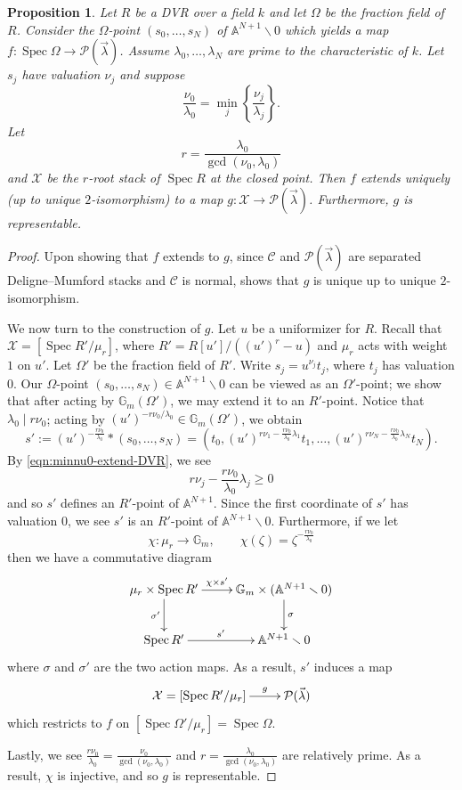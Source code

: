\documentclass[a4paper,12pt]{amsart}
\newtheorem{prop}[thm]{Proposition}
\theoremstyle{definition}
\newcommand{\bG}{\mathbb{G}}
\newcommand{\bA}{\mathbb{A}}
\newcommand{\cX}{\mathcal{X}}
\newcommand{\cC}{\mathcal{C}}
\newcommand{\Pcv}{\mathcal{P}(\vec{\lambda})}
\DeclareMathOperator{\Spec}{Spec}
\renewcommand{\setminus}{\smallsetminus}
\begin{document}
	\begin{prop}\label{prop:univ-tuning-stack-local-computation}
		Let $R$ be a DVR over a field $k$ and let $\Omega$ be the fraction field of $R$. Consider the $\Omega$-point $(s_0,\dots,s_N)$ of $\bA^{N+1}\setminus0$ which yields a map $f\colon\Spec\Omega\to\Pcv$. Assume $\lambda_0,\dots,\lambda_N$ are prime to the characteristic of $k$. Let $s_j$ have valuation $\nu_j$ and suppose
		\begin{equation}\label{eqn:minnu0-extend-DVR}
			\frac{\nu_0}{\lambda_0}=\min_j\left\{\frac{\nu_j}{\lambda_j}\right\}.
		\end{equation}
		Let
		\[
		r=\frac{\lambda_0}{\gcd(\nu_0,\lambda_0)}
		\]
		and $\cX$ be the $r$-root stack of $\Spec R$ at the closed point. Then $f$ extends uniquely (up to unique $2$-isomorphism) to a map $g\colon\cX\to\Pcv$. Furthermore, $g$ is representable.
	\end{prop}
	\begin{proof}
		Upon showing that $f$ extends to $g$, since $\cC$ and $\Pcv$ are separated Deligne--Mumford stacks and $\cC$ is normal, \cite[Prop. 1.2]{FMN} shows that $g$ is unique up to unique $2$-isomorphism.
		
		We now turn to the construction of $g$. Let $u$ be a uniformizer for $R$. Recall that $\cX=[\Spec R'/\mu_r]$, where $R'=R[u']/((u')^r-u)$ and $\mu_r$ acts with weight $1$ on $u'$. Let $\Omega'$ be the fraction field of $R'$. Write $s_j=u^{\nu_j}t_j$, where $t_j$ has valuation $0$. Our $\Omega$-point $(s_0,\dots,s_N)\in\bA^{N+1}\setminus0$ can be viewed as an $\Omega'$-point; we show that after acting by $\bG_m(\Omega')$, we may extend it to an $R'$-point. Notice that $\lambda_0\mid r\nu_0$; acting by $(u')^{-r\nu_0/\lambda_0}\in\bG_m(\Omega')$, we obtain
		\[
		s':=(u')^{-\frac{r\nu_0}{\lambda_0}}*(s_0,\dots,s_N)=(t_0,(u')^{r\nu_1-\frac{r\nu_0}{\lambda_0}\lambda_1}t_1,\dots,(u')^{r\nu_N-\frac{r\nu_0}{\lambda_0}\lambda_N}t_N).
		\]
		By \eqref{eqn:minnu0-extend-DVR}, we see
		\[
		r\nu_j-\frac{r\nu_0}{\lambda_0}\lambda_j\geq0
		\]
		and so $s'$ defines an $R'$-point of $\bA^{N+1}$. Since the first coordinate of $s'$ has valuation $0$, we see $s'$ is an $R'$-point of $\bA^{N+1}\setminus0$. Furthermore, if we let
		\[
		\chi\colon\mu_r\to\bG_m,\quad\quad\chi(\zeta)=\zeta^{-\frac{r\nu_0}{\lambda_0}}
		\]
		then we have a commutative diagram
		\[
		\xymatrix{
			\mu_r\times\Spec R'\ar[r]^-{\chi\times s'}\ar[d]_-{\sigma'} & \bG_m\times(\bA^{N+1}\setminus0)\ar[d]^-{\sigma}\\
			\Spec R'\ar[r]^-{s'} & \bA^{N+1}\setminus0
		}
		\]
		where $\sigma$ and $\sigma'$ are the two action maps. As a result, $s'$ induces a map
		\[
		\xymatrix{
			\cX=[\Spec R'/\mu_r]\ar[r]^-{g} & \Pcv
		}
		\]
		which restricts to $f$ on $[\Spec\Omega'/\mu_r]=\Spec\Omega$.
		
		Lastly, we see $\frac{r\nu_0}{\lambda_0}=\frac{\nu_0}{\gcd(\nu_0,\lambda_0)}$ and $r=\frac{\lambda_0}{\gcd(\nu_0,\lambda_0)}$ are relatively prime. As a result, $\chi$ is injective, and so $g$ is representable.
	\end{proof}
	
\end{document}
